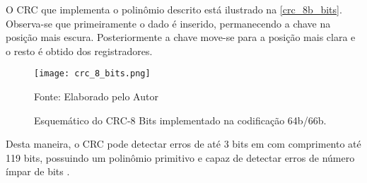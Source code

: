 O CRC que implementa o polinômio descrito está ilustrado na \autoref{crc_8b_bits}. Observa-se que primeiramente o dado é inserido, permanecendo a chave na posição mais escura. Posteriormente a chave move-se para a posição mais clara e o resto é obtido dos registradores.

\begin{figure}[H]
	\caption{\label{crc_8b_bits} Esquemático do CRC-8 Bits implementado na codificação 64b/66b.}
	\centering
	\texttt{[image: crc\_8\_bits.png]}
	\begin{center}
		Fonte: Elaborado pelo Autor
	\end{center}	
\end{figure}

Desta maneira, o CRC pode detectar erros de até 3 bits em com comprimento até 119 bits, possuindo um polinômio primitivo e capaz de detectar erros de número ímpar de bits \cite{Tridib2004}. 